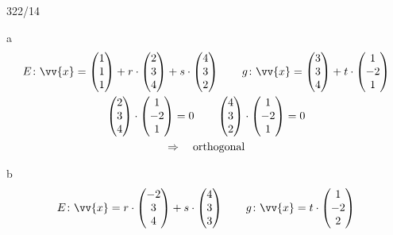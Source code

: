 \begin{exercise}{322/14}
  \item [a]
  \begin{gather*}
    E \colon \vv{x} = \begin{pmatrix}1 \\ 1 \\ 1\end{pmatrix} + r \cdot \begin{pmatrix}2 \\ 3 \\ 4\end{pmatrix} + s \cdot \begin{pmatrix}4 \\ 3 \\ 2\end{pmatrix} \qquad g \colon \vv{x} = \begin{pmatrix}3 \\ 3 \\ 4\end{pmatrix} + t \cdot \begin{pmatrix}1 \\ -2 \\ 1\end{pmatrix} \\
    \begin{pmatrix}2 \\ 3 \\ 4\end{pmatrix} \cdot \begin{pmatrix}1 \\ -2 \\ 1\end{pmatrix} = 0 \qquad \begin{pmatrix}4 \\ 3 \\ 2\end{pmatrix} \cdot \begin{pmatrix}1 \\ -2 \\ 1\end{pmatrix} = 0 \\
    \Rightarrow\quad \text{orthogonal}
  \end{gather*}
  \item [b]
  \begin{gather*}
    E \colon \vv{x} = r \cdot \begin{pmatrix}-2 \\ 3 \\ 4\end{pmatrix} + s \cdot \begin{pmatrix}4 \\ 3 \\ 3\end{pmatrix} \qquad g \colon \vv{x} = t \cdot \begin{pmatrix}1 \\ -2 \\ 2\end{pmatrix} \\

\end{gather*}
\end{exercise}
